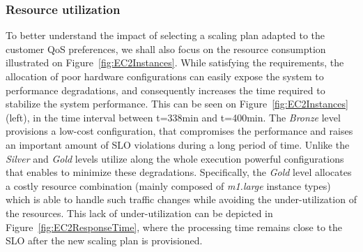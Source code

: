 \subsubsection{Resource utilization} 
To better understand the impact of selecting a scaling plan adapted to the customer QoS preferences, we shall also focus on the resource consumption illustrated on Figure~\ref{fig:EC2Instances}. While satisfying the requirements, the allocation of poor hardware configurations can easily expose the system to performance degradations, and consequently increases the time required to stabilize the system performance. This can be seen on  Figure~\ref{fig:EC2Instances}(left), in the time interval between t=338min and t=400min. The \emph{Bronze} level provisions a low-cost configuration, that compromises the performance and raises an important amount of SLO violations during a long period of time. Unlike the \emph{Silver} and \emph{Gold} levels utilize along the whole execution powerful configurations that enables to minimize these degradations. Specifically, the \emph{Gold} level allocates a costly resource combination (mainly composed of \emph{m1.large} instance types) which is able to handle such traffic changes while avoiding the under-utilization of the resources. This lack of under-utilization can be depicted in Figure~\ref{fig:EC2ResponseTime}, where the processing time remains close to the SLO after the new scaling plan is provisioned.


\setcounter{figure}{7}

